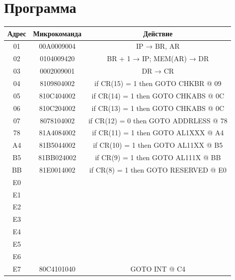 \section{Программа}
\begin{center}
    \begin{tabular}{|c|c|c|}
        \hline
        Адрес   & Микрокоманда & Действие   \\
        \hline
        01  & 00A0009004    & IP → BR, AR   \\
        \hline
        02  & 0104009420    & BR + 1 → IP; MEM(AR) → DR \\
        \hline
        03  & 0002009001    & DR → CR   \\
        \hline
        04  & 8109804002    & if CR(15) = 1 then GOTO CHKBR @ 09    \\
        \hline
        05  & 810C404002    & if CR(14) = 1 then GOTO CHKABS @ 0C   \\
        \hline
        06  & 810C204002    & if CR(13) = 1 then GOTO CHKABS @ 0C   \\
        \hline
        07  & 8078104002    & if CR(12) = 0 then GOTO ADDRLESS @ 78 \\
        \hline
        78  & 81A4084002    & if CR(11) = 1 then GOTO AL1XXX @ A4   \\
        \hline
        A4  & 81B5044002    & if CR(10) = 1 then GOTO AL11XX @ B5   \\
        \hline
        B5  & 81BB024002    & if CR(9) = 1 then GOTO AL111X @ BB    \\
        \hline
        BB  & 81E0014002    & if CR(8) = 1 then GOTO RESERVED @ E0  \\
        \hline
        E0  & & \\ %
        \hline
        E1  & & \\ %
        \hline
        E2  & & \\ %
        \hline
        E3  & & \\ %
        \hline
        E4  & & \\ %
        \hline
        E5  & & \\ %
        \hline
        E6  & & \\ %
        \hline
        E7  & 80C4101040    & GOTO INT @ C4 \\
        \hline
    \end{tabular}
\end{center}

